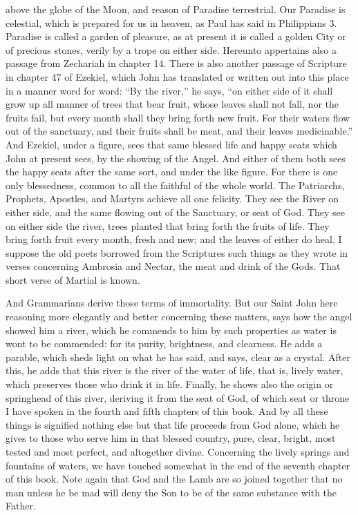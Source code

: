 above the globe of the Moon, and reason of Paradise terrestrial. Our Paradise is celestial, which is prepared for us in heaven, as Paul has said in Philippians 3. Paradise is called a garden of pleasure, as at present it is called a golden City or of precious stones, verily by a trope on either side. Hereunto appertains also a passage from Zechariah in chapter 14. There is also another passage of Scripture in chapter 47 of Ezekiel, which John has translated or written out into this place in a manner word for word: “By the river,” he says, “on either side of it shall grow up all manner of trees that bear fruit, whose leaves shall not fall, nor the fruits fail, but every month shall they bring forth new fruit. For their waters flow out of the sanctuary, and their fruits shall be meat, and their leaves medicinable.” And Ezekiel, under a figure, sees that same blessed life and happy seats which John at present sees, by the showing of the Angel. And either of them both sees the happy seats after the same sort, and under the like figure. For there is one only blessedness, common to all the faithful of the whole world. The Patriarchs, Prophets, Apostles, and Martyrs achieve all one felicity. They see the River on either side, and the same flowing out of the Sanctuary, or seat of God. They see on either side the river, trees planted that bring forth the fruits of life. They bring forth fruit every month, fresh and new; and the leaves of either do heal. I suppose the old poets borrowed from the Scriptures such things as they wrote in verses concerning Ambrosia and Nectar, the meat and drink of the Gods. That short verse of Martial is known.

And Grammarians derive those terms of immortality. But our Saint John here reasoning more elegantly and better concerning these matters, says how the angel showed him a river, which he commends to him by such properties as water is wont to be commended: for its purity, brightness, and clearness. He adds a parable, which sheds light on what he has said, and says, clear as a crystal. After this, he adds that this river is the river of the water of life, that is, lively water, which preserves those who drink it in life. Finally, he shows also the origin or springhead of this river, deriving it from the seat of God, of which seat or throne I have spoken in the fourth and fifth chapters of this book. And by all these things is signified nothing else but that life proceeds from God alone, which he gives to those who serve him in that blessed country, pure, clear, bright, most tested and most perfect, and altogether divine. Concerning the lively springs and fountains of waters, we have touched somewhat in the end of the seventh chapter of this book. Note again that God and the Lamb are so joined together that no man unless he be mad will deny the Son to be of the same substance with the Father.

